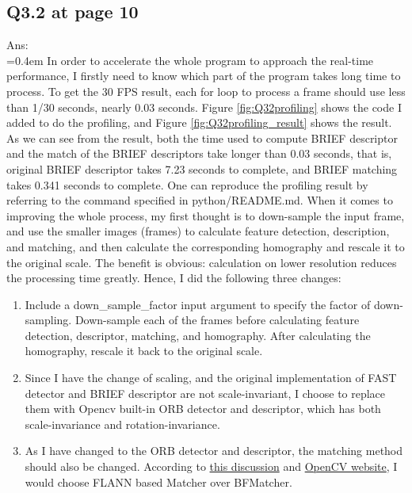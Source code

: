 \documentclass{article}
\begin{document}
	\newpage
	\subsection*{Q3.2 at page 10}
	Ans:\\
	\hangindent=0.4em \hspace{0.3em} In order to accelerate the whole program to approach the real-time performance, I firstly need to know which part of the program takes long time to process. To get the 30 FPS result, each for loop to process a frame should use less than 1/30 seconds, nearly 0.03 seconds. Figure \ref{fig:Q32profiling} shows the code I added to do the profiling, and Figure \ref{fig:Q32profiling_result} shows the result. As we can see from the result, both the time used to compute BRIEF descriptor and the match of the BRIEF descriptors take longer than 0.03 seconds, that is, original BRIEF descriptor takes 7.23 seconds to complete, and BRIEF matching takes 0.341 seconds to complete. One can reproduce the profiling result by referring to the command specified in python/README.md. When it comes to improving the whole process, my first thought is to down-sample the input frame, and use the smaller images (frames) to calculate feature detection, description, and matching, and then calculate the corresponding homography and rescale it to the original scale. The benefit is obvious: calculation on lower resolution reduces the processing time greatly. Hence, I did the following three changes:
	\begin{enumerate}
	\item Include a down\_sample\_factor input argument to specify the factor of down-sampling. Down-sample each of the frames before calculating feature detection, descriptor, matching, and homography. After calculating the homography, rescale it back to the original scale.
	\item Since I have the change of scaling, and the original implementation of FAST detector and BRIEF descriptor are not scale-invariant, I choose to replace them with Opencv built-in ORB detector and descriptor, which has both scale-invariance and rotation-invariance.
	\item As I have changed to the ORB detector and descriptor, the matching method should also be changed. According to \href{https://stackoverflow.com/questions/10610966/difference-between-bfmatcher-and-flannbasedmatcher}{this discussion} and \href{https://docs.opencv.org/4.x/dc/dc3/tutorial_py_matcher.html}{OpenCV website}, I would choose FLANN based Matcher over BFMatcher.
	\end{enumerate}
\end{document}

